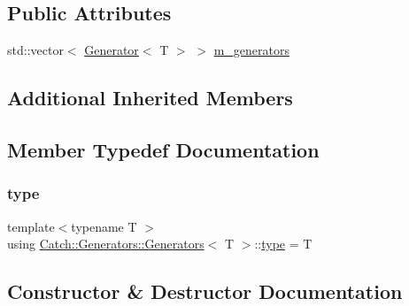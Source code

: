 \subsection*{Public Attributes}
\begin{DoxyCompactItemize}
\item 
std\+::vector$<$ \mbox{\hyperlink{class_catch_1_1_generators_1_1_generator}{Generator}}$<$ T $>$ $>$ \mbox{\hyperlink{struct_catch_1_1_generators_1_1_generators_a49f1d0e8851a4726bb9981edffe094fa}{m\+\_\+generators}}
\end{DoxyCompactItemize}
\subsection*{Additional Inherited Members}


\subsection{Member Typedef Documentation}
\mbox{\label{struct_catch_1_1_generators_1_1_generators_aab27f98a577b49532b2ca7556a84286b}} 
\subsubsection{\texorpdfstring{type}{type}}
{\footnotesize\ttfamily template$<$typename T $>$ \\
using \mbox{\hyperlink{struct_catch_1_1_generators_1_1_generators}{Catch\+::\+Generators\+::\+Generators}}$<$ T $>$\+::\mbox{\hyperlink{struct_catch_1_1_generators_1_1_generators_aab27f98a577b49532b2ca7556a84286b}{type}} =  T}



\subsection{Constructor \& Destructor Documentation}
\mbox{\label{struct_catch_1_1_generators_1_1_generators_ad936c563841f7db16a301576c40622e4}} 
